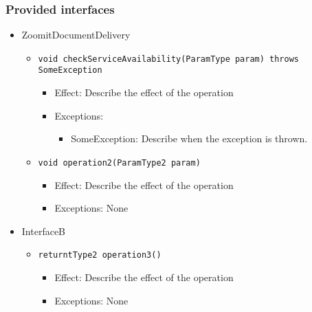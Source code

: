 \subsubsection*{Provided interfaces}
\begin{itemize}
    \item ZoomitDocumentDelivery
    \begin{itemize}
        \item \texttt{void checkServiceAvailability(ParamType param) throws SomeException}
        \begin{itemize}
            \item Effect: Describe the effect of the operation
            \item Exceptions:
            \begin{itemize}
                \item SomeException: Describe when the exception is thrown.
            \end{itemize}
        \end{itemize}

        \item \texttt{void operation2(ParamType2 param)}
		    \begin{itemize}
                \item Effect: Describe the effect of the operation
                \item Exceptions: None
            \end{itemize}
    \end{itemize}

    \item InterfaceB
    \begin{itemize}
        \item \texttt{returntType2 operation3()}
        \begin{itemize}
            \item Effect: Describe the effect of the operation
            \item Exceptions: None
        \end{itemize}
    \end{itemize}
\end{itemize}